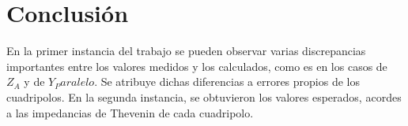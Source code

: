 \documentclass[a4paper]{article}
\begin{document}
\section*{Conclusión}

En la primer instancia del trabajo se pueden observar varias discrepancias importantes entre los valores medidos y los calculados, como es en los casos de $Z_A$ y de $Y_Paralelo$. Se atribuye dichas diferencias a errores propios de los cuadripolos.
En la segunda instancia, se obtuvieron los valores esperados, acordes a las impedancias de Thevenin de cada cuadripolo.
\end{document}
